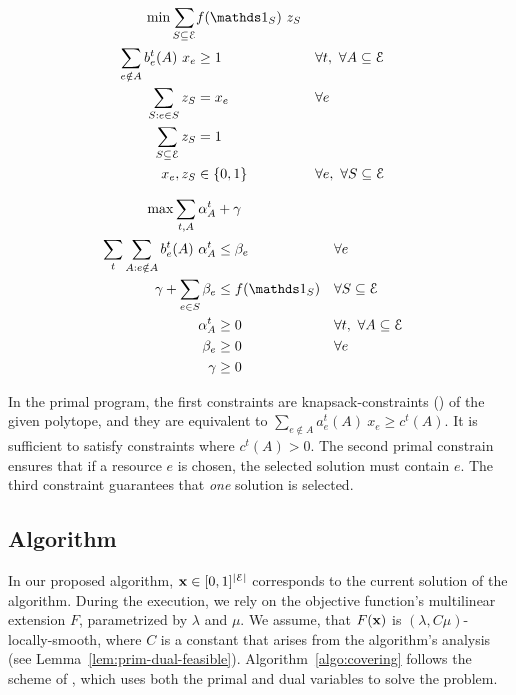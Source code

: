 \begin{minipage}[t]{0.45\textwidth}
\begin{align*}
\min  \sum_{S \subseteq \mathcal{E}} &f(\one_{S})\ z_{S} \\
\sum_{e \notin A} b_{e}^{t}(A) \ x_{e} &\geq 1 & &  \forall t,\ \forall A \subseteq \mathcal{E} \\
\sum_{S: e \in S} z_{S}  &= x_{e}	& & \forall e \\
\sum_{S \subseteq \mathcal{E}} z_{S} &= 1 & & \\
x_{e}, z_{S} &\in \{0,1\} & & \forall e,\ \forall S \subseteq \mathcal{E}\\
\end{align*}
\end{minipage}
\quad
\begin{minipage}[t]{0.5\textwidth}
\begin{align*}
\max \sum_{t, A} \alpha^{t}_{A} &+ \gamma \\
\sum_{t} \sum_{A: e \notin A} b_{e}^{t}(A) \ \alpha_{A}^{t} &\leq \beta_{e}  & &  \forall e \\
\gamma + \sum_{e \in S} \beta_{e} &\leq f(\one_{S})  & & \forall S \subseteq \mathcal{E}\\
\alpha^{t}_{A} &\geq 0 & & \forall t,\ \forall A \subseteq \mathcal{E}\\
\beta_e &\geq 0 & & \forall e\\
\gamma &\geq 0 & &
\end{align*}
\end{minipage}

In the primal program, the first constraints are knapsack-constraints (\cite{CarrFleischer:2000}) of the given polytope, and they are equivalent to $\sum_{e \notin A} a_{e}^{t}(A) \ x_{e} \geq c^{t}(A)$. It is sufficient to satisfy constraints where $c^{t}(A) > 0$. The second primal constrain ensures that if a resource $e$ is chosen, the selected solution must contain $e$.
The third constraint guarantees that \emph{one} solution is selected.

\subsection{Algorithm}
In our proposed algorithm, $\mathbf{x} \in [0, 1]^{|\mathcal{E}|}$ corresponds to the current solution of the algorithm. During the execution, we rely on the objective function's multilinear extension $F$, parametrized by $\lambda$ and $\mu$. We assume, that $F(\mathbf{x})$ is $(\lambda, C \mu)$-locally-smooth, where $C$ is a constant that arises from the algorithm's analysis (see Lemma~\ref{lem:prim-dual-feasible}). Algorithm~\ref{algo:covering} follows the scheme of \cite{Thang20:Online-Primal-Dual}, which uses both the primal and dual variables to solve the problem.

